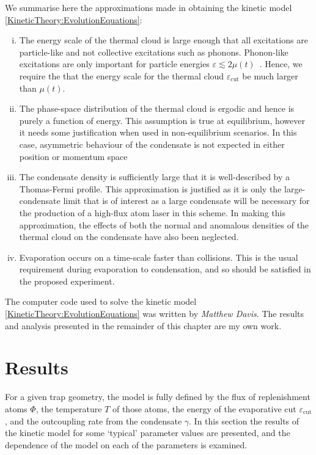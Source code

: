We summarise here the approximations made in obtaining the kinetic model \eqref{KineticTheory:EvolutionEquations}:
\begin{enumerate}[(i)]
    \item The energy scale of the thermal cloud is large enough that all excitations are particle-like and not collective excitations such as phonons. Phonon-like excitations are only important for particle energies $\varepsilon \lesssim 2\mu(t)$~\citep[\S 8.3.1]{PethickSmith}. Hence, we require the that the energy scale for the thermal cloud $\varepsilon_\text{cut}$ be much larger than $\mu(t)$.
    \item The phase-space distribution of the thermal cloud is ergodic and hence is purely a function of energy. This assumption is true at equilibrium, however it needs some justification when used in non-equilibrium scenarios. In this case, asymmetric behaviour of the condensate is not expected in either position or momentum space 
    \item The condensate density is sufficiently large that it is well-described by a Thomas-Fermi profile. This approximation is justified as it is only the large-condensate limit that is of interest as a large condensate will be necessary for the production of a high-flux atom laser in this scheme. In making this approximation, the effects of both the normal and anomalous densities of the thermal cloud on the condensate have also been neglected.
    \item Evaporation occurs on a time-scale faster than collisions. This is the usual requirement during evaporation to condensation, and so should be satisfied in the proposed experiment.
\end{enumerate}

The computer code used to solve the kinetic model \eqref{KineticTheory:EvolutionEquations} was written by \emph{Matthew Davis}. The results and analysis presented in the remainder of this chapter are my own work.

\section{Results}
\label{KineticTheory:Results}

For a given trap geometry, the model is fully defined by the flux of replenishment atoms $\Phi$, the temperature $T$ of those atoms, the energy of the evaporative cut $\varepsilon_\text{cut}$, and the outcoupling rate from the condensate $\gamma$. In this section the results of the kinetic model for some `typical' parameter values are presented, and the dependence of the model on each of the parameters is examined.

